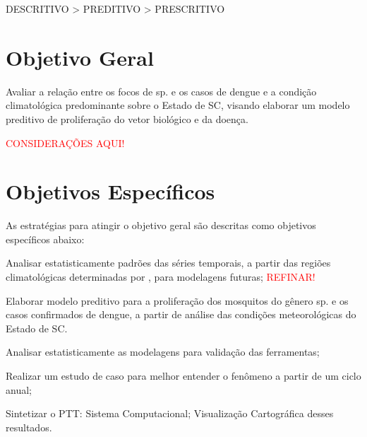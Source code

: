\indent DESCRITIVO > PREDITIVO > PRESCRITIVO
 
 \section{Objetivo Geral}
 Avaliar a relação entre os focos de  sp. e os casos de dengue e a condição climatológica predominante sobre o Estado de \acrlong{SC}, visando elaborar um modelo preditivo de proliferação do vetor biológico e da doença.

\begin{center}
\textcolor{red}{CONSIDERAÇÕES AQUI!}\\ 
\end{center}



 
\section{Objetivos Específicos}
As estratégias para atingir o objetivo geral são descritas como objetivos específicos abaixo:

\begin{alineas}
\item Analisar estatisticamente padrões das séries temporais, a partir das regiões climatológicas determinadas por , para modelagens futuras; \textcolor{red}{REFINAR!}
\item Elaborar modelo preditivo para a proliferação dos mosquitos do gênero  sp. e os casos confirmados de dengue, a partir de análise das condições meteorológicas do Estado de \acrlong{SC}.
\item Analisar estatisticamente as modelagens para validação das ferramentas;
\item Realizar um estudo de caso para melhor entender o fenômeno a partir de um ciclo anual;
\item Sintetizar o \acrfull{PTT}:
\subitem Sistema Computacional;
\subitem Visualização Cartográfica desses resultados.
\end{alineas}
